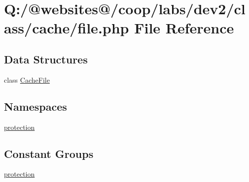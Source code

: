 \hypertarget{file_8php}{\section{Q\-:/@websites@/coop/labs/dev2/class/cache/file.php File Reference}
\label{file_8php}
}
\subsection*{Data Structures}
\begin{DoxyCompactItemize}
\item 
class \hyperlink{class_cache_file}{Cache\-File}
\end{DoxyCompactItemize}
\subsection*{Namespaces}
\begin{DoxyCompactItemize}
\item 
\hyperlink{namespaceprotection}{protection}
\end{DoxyCompactItemize}
\subsection*{Constant Groups}
\begin{DoxyCompactItemize}
\item 
\hyperlink{namespaceprotection}{protection}
\end{DoxyCompactItemize}
